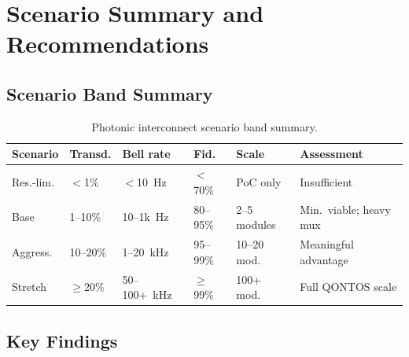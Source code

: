 \documentclass[conference]{IEEEtran}
\begin{document}
\section{Scenario Summary and Recommendations}

\subsection{Scenario Band Summary}

\begin{table}[H]
\centering
\caption{Photonic interconnect scenario band summary.}
\label{tab:scenario-summary}
\footnotesize
\begin{tabularx}{\columnwidth}{L{1.1cm}L{0.9cm}L{0.9cm}L{0.8cm}L{1.2cm}L{1.5cm}}
\toprule
\textbf{Scenario} & \textbf{Transd.} & \textbf{Bell rate} & \textbf{Fid.} & \textbf{Scale} & \textbf{Assessment} \\
\midrule
Res.-lim. & $<$1\% & $<$10~Hz & $<$70\% & PoC only & Insufficient \\
Base & 1--10\% & 10--1k~Hz & 80--95\% & 2--5 modules & Min.\ viable; heavy mux \\
Aggress. & 10--20\% & 1--20~kHz & 95--99\% & 10--20 mod. & Meaningful advantage \\
Stretch & $\geq$20\% & 50--100+~kHz & $\geq$99\% & 100+ mod. & Full QONTOS scale \\
\bottomrule
\end{tabularx}
\end{table}

\subsection{Key Findings}
\end{document}
